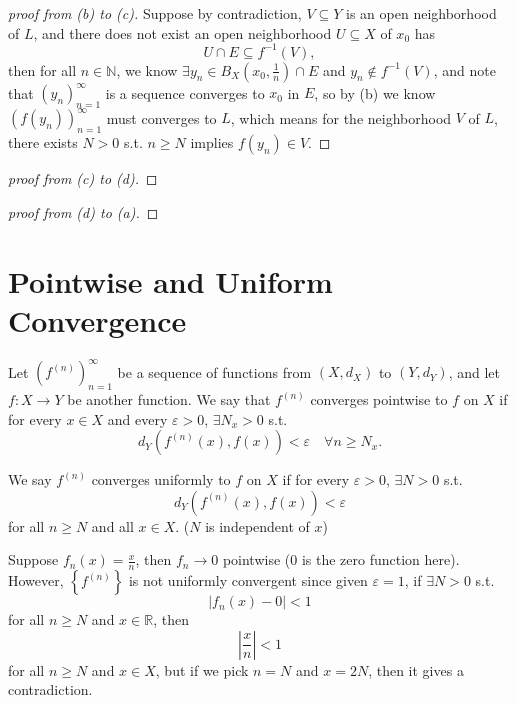 \begin{proof}[proof from (b) to (c)]
    Suppose by contradiction, \(V \subseteq Y\) is an open neighborhood of \(L\), and there does not exist an open neighborhood \(U \subseteq X\)  of \(x_0\) has
    \[
        U \cap E \subseteq f^{-1}(V),
    \] then for all \(n \in \mathbb{N} \), we know \(\exists y_n \in B_X \left( x_0, \frac{1}{n} \right) \cap E \) and \(y_n \notin f^{-1}(V)\), and note that \(\left( y_n \right)_{n=1}^{\infty}  \) is a sequence converges to \(x_0\) in \(E\), so by (b) we know \(\left( f \left( y_n \right)  \right)_{n=1}^{\infty}  \) must converges to \(L\), which means for the neighborhood \(V\) of \(L\), there exists \(N > 0\) s.t. \(n \ge N\) implies \(f(y_n) \in V\).            
\end{proof}
\begin{proof}[proof from (c) to (d)]
\end{proof}
\begin{proof}[proof from (d) to (a)]
\end{proof}

\section{Pointwise and Uniform Convergence}
\begin{definition} \label{def: Pointwise convergence}
    Let \(\left( f^{(n)} \right)_{n=1}^{\infty}  \) be a sequence of functions from \((X, d_X)\) to \((Y, d_Y)\), and let \(f: X \to Y\) be another function. We say that \(f^{(n)}\) converges pointwise to \(f\) on \(X\) if for every \(x \in X\) and every \(\varepsilon > 0\), \(\exists N_x > 0\) s.t.
    \[
        d_Y \left( f^{(n)}(x), f(x) \right) < \varepsilon \quad \forall n \ge N_x .
    \]        
\end{definition}

\begin{definition} \label{def: uniformly convergence}
    We say \(f^{(n)}\) converges uniformly to \(f\) on \(X\) if for every \(\varepsilon > 0\), \(\exists N > 0\) s.t. 
    \[
        d_Y \left( f^{(n)}(x), f(x) \right) < \varepsilon  
    \] for all \(n \ge N\) and all \(x \in X\). (\(N\) is independent of \(x\))    
\end{definition}

\begin{eg}
    Suppose \(f_n(x) = \frac{x}{n}\), then \(f_n \to 0\) pointwise (\(0\) is the zero function here). However, \(\left\{ f^{(n)} \right\} \) is not uniformly convergent since given \(\varepsilon = 1\), if \(\exists N > 0\) s.t. 
    \[
        \left\vert f_n(x) - 0 \right\vert < 1 
    \] for all \(n \ge N\) and \(x \in \mathbb{R} \), then 
    \[
        \left\vert \frac{x}{n} \right\vert < 1 
    \] for all \(n \ge N\) and \(x \in X\), but if we pick \(n = N\) and \(x = 2N\), then it gives a contradiction.   
\end{eg}

